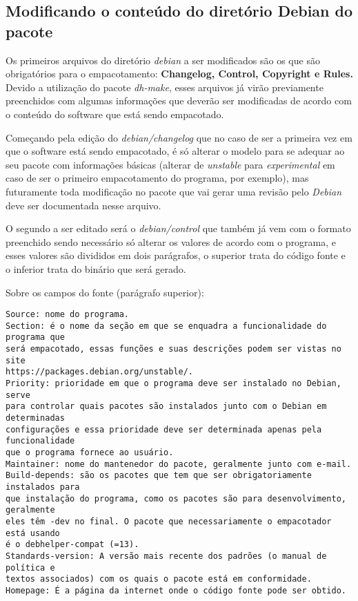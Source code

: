 \subsection{Modificando o conteúdo do diretório Debian do pacote}

Os primeiros arquivos do diretório \textit{debian} a ser modificados são os que são obrigatórios para o empacotamento:\textbf{ Changelog, Control, Copyright e Rules.} Devido a utilização do pacote \textit{dh-make}, esses arquivos já virão previamente preenchidos com algumas informações que deverão ser modificadas de acordo com o conteúdo do software que está sendo empacotado.

Começando pela edição do \textit{debian/changelog} que no caso de ser a primeira vez em que o software está sendo empacotado, é só alterar o modelo para se adequar ao seu pacote com informações básicas (alterar de \textit{unstable} para \textit{experimental} em caso de ser o primeiro empacotamento do programa, por exemplo), mas futuramente toda modificação no pacote que vai gerar uma revisão pelo \textit{Debian} deve ser documentada nesse arquivo. 

O segundo a ser editado será o\textit{ debian/control} que também já vem com o formato preenchido sendo necessário só alterar os valores de acordo com o programa, e esses valores são divididos em dois parágrafos, o superior trata do código fonte e o inferior trata do binário que será gerado.

Sobre os campos do fonte (parágrafo superior):
\begin{verbatim}
Source: nome do programa.
Section: é o nome da seção em que se enquadra a funcionalidade do programa que
será empacotado, essas funções e suas descrições podem ser vistas no site 
https://packages.debian.org/unstable/.
Priority: prioridade em que o programa deve ser instalado no Debian, serve
para controlar quais pacotes são instalados junto com o Debian em determinadas 
configurações e essa prioridade deve ser determinada apenas pela funcionalidade
que o programa fornece ao usuário.
Maintainer: nome do mantenedor do pacote, geralmente junto com e-mail.
Build-depends: são os pacotes que tem que ser obrigatoriamente instalados para
que instalação do programa, como os pacotes são para desenvolvimento, geralmente
eles têm -dev no final. O pacote que necessariamente o empacotador está usando
é o debhelper-compat (=13).
Standards-version: A versão mais recente dos padrões (o manual de política e
textos associados) com os quais o pacote está em conformidade. 
Homepage: É a página da internet onde o código fonte pode ser obtido.
\end{verbatim}

